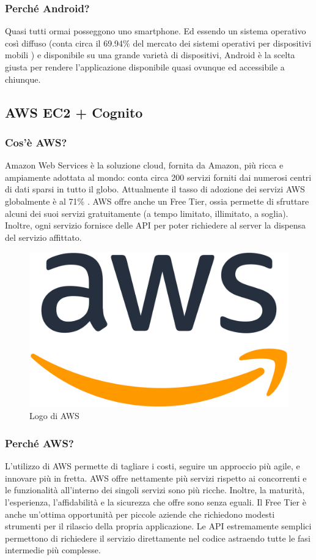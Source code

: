             \subsubsection{Perché Android?}
                Quasi tutti ormai posseggono uno smartphone. Ed essendo un sistema operativo così diffuso (conta circa il 69.94\% del mercato dei sistemi operativi per dispositivi mobili \cite{Statcounter1}) e disponibile su una grande varietà di dispositivi, Android è la scelta giusta per rendere l'applicazione disponibile quasi ovunque ed accessibile a chiunque.

         \subsection{AWS EC2 + Cognito}
            \subsubsection{Cos'è AWS? \cite{AWS1}}
                Amazon Web Services è la soluzione cloud, fornita da Amazon, più ricca e ampiamente adottata al mondo: conta circa 200 servizi forniti dai numerosi centri di dati sparsi in tutto il globo. Attualmente il tasso di adozione dei servizi AWS globalmente è al 71\% \cite{CNN1}. AWS offre anche un Free Tier, ossia permette di sfruttare alcuni dei suoi servizi gratuitamente (a tempo limitato, illimitato, a soglia). Inoltre, ogni servizio fornisce delle API per poter richiedere al server la dispensa del servizio affittato.
            \begin{figure}[htbp!]
                \centering
                \includegraphics[width=0.2\linewidth]{Immagini/System Design/AWS.png}
                \caption{Logo di AWS}
            \end{figure}
            \subsubsection{Perché AWS? \cite{AWS1}}
                L'utilizzo di AWS permette di tagliare i costi, seguire un approccio più agile, e innovare più in fretta. AWS offre nettamente più servizi rispetto ai concorrenti e le funzionalità all'interno dei singoli servizi sono più ricche. Inoltre, la maturità, l'esperienza, l'affidabilità e la sicurezza che offre sono senza eguali. Il Free Tier è anche un'ottima opportunità per piccole aziende che richiedono modesti strumenti per il rilascio della propria applicazione. Le API estremamente semplici permettono di richiedere il servizio direttamente nel codice astraendo tutte le fasi intermedie più complesse.
